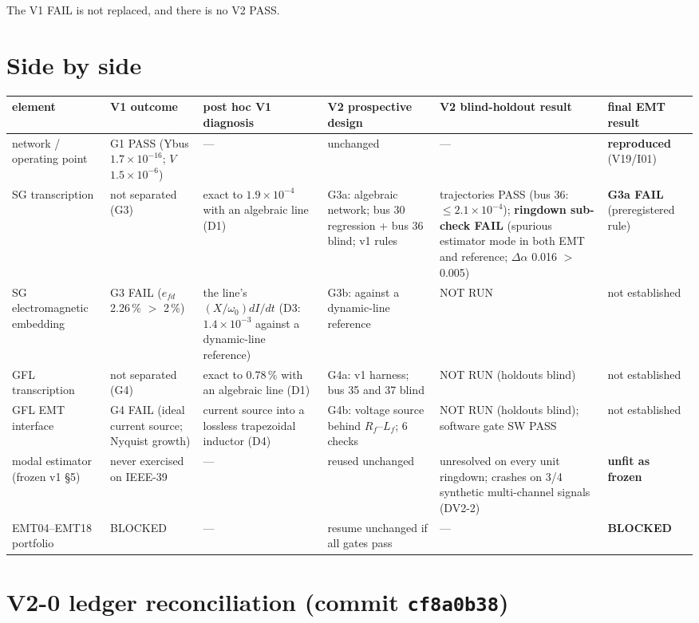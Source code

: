 \documentclass[10pt,a4paper]{article}
\begin{document}
The V1 FAIL is not replaced, and there is no V2 PASS.

\section{Side by side}

{\footnotesize
\begin{longtable}{@{}L{2.1cm}L{2.2cm}L{2.5cm}L{2.7cm}L{3.2cm}L{2.1cm}@{}}
\toprule
element & V1 outcome & post hoc V1 diagnosis & V2 prospective design & V2 blind-holdout result & final EMT result\\
\midrule\endhead
network / operating point & G1 PASS (Ybus $1.7\times10^{-16}$; $V$ $1.5\times10^{-6}$) & --- & unchanged & --- & \textbf{reproduced} (V19/I01)\\
SG transcription & not separated (G3) & exact to $1.9\times10^{-4}$ with an algebraic line (D1) & G3a: algebraic network; bus 30 regression + bus 36 blind; v1 rules & trajectories PASS (bus 36: $\le 2.1\times10^{-4}$); \textbf{ringdown sub-check FAIL} (spurious estimator mode in both EMT and reference; $\Delta\alpha$ 0.016 $>$ 0.005) & \textbf{G3a FAIL} (preregistered rule)\\
SG electromagnetic embedding & G3 FAIL ($e_{fd}$ 2.26\,\% $>$ 2\,\%) & the line's $(X/\omega_0)dI/dt$ (D3: $1.4\times10^{-3}$ against a dynamic-line reference) & G3b: against a dynamic-line reference & NOT RUN & not established\\
GFL transcription & not separated (G4) & exact to 0.78\,\% with an algebraic line (D1) & G4a: v1 harness; bus 35 and 37 blind & NOT RUN (holdouts blind) & not established\\
GFL EMT interface & G4 FAIL (ideal current source; Nyquist growth) & current source into a lossless trapezoidal inductor (D4) & G4b: voltage source behind $R_f$--$L_f$; 6 checks & NOT RUN (holdouts blind); software gate SW PASS & not established\\
modal estimator (frozen v1 \S5) & never exercised on IEEE-39 & --- & reused unchanged & unresolved on every unit ringdown; crashes on 3/4 synthetic multi-channel signals (DV2-2) & \textbf{unfit as frozen}\\
EMT04--EMT18 portfolio & BLOCKED & --- & resume unchanged if all gates pass & --- & \textbf{BLOCKED}\\
\bottomrule
\end{longtable}}

\section{V2-0 ledger reconciliation (commit \texttt{cf8a0b38})}
\end{document}
